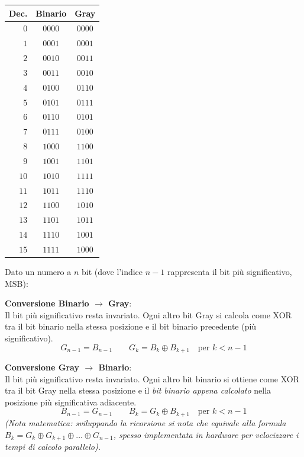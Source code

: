 \begin{minipage}[t]{0.30\linewidth}
\vspace{0pt}
\centering
\begin{tabular}{r c c}
\toprule
Dec. & Binario & Gray\\
\midrule
$0$  & $0000$ & $0000$ \\
$1$  & $0001$ & $0001$ \\
$2$  & $0010$ & $0011$ \\
$3$  & $0011$ & $0010$ \\
$4$  & $0100$ & $0110$ \\
$5$  & $0101$ & $0111$ \\
$6$  & $0110$ & $0101$ \\
$7$  & $0111$ & $0100$ \\
\midrule
$8$  & $1000$ & $1100$ \\
$9$  & $1001$ & $1101$ \\
$10$ & $1010$ & $1111$ \\
$11$ & $1011$ & $1110$ \\
$12$ & $1100$ & $1010$ \\
$13$ & $1101$ & $1011$ \\
$14$ & $1110$ & $1001$ \\
$15$ & $1111$ & $1000$ \\
\bottomrule
\end{tabular}
\end{minipage}%
\hfill
\begin{minipage}[t]{0.66\linewidth}
\vspace{0pt}
\noindent Dato un numero a $n$ bit (dove l'indice $n-1$ rappresenta il bit più significativo, MSB):

\medskip
\textbf{Conversione Binario $\to$ Gray}:\\
Il bit più significativo resta invariato. Ogni altro bit Gray si calcola come XOR tra il bit binario nella stessa posizione e il bit binario precedente (più significativo).
\[
G_{n-1} = B_{n-1} \qquad G_k = B_k \oplus B_{k+1} \quad \text{per } k < n-1
\]

\medskip
\textbf{Conversione Gray $\to$ Binario}:\\
Il bit più significativo resta invariato. Ogni altro bit binario si ottiene come XOR tra il bit Gray nella stessa posizione e il \emph{bit binario appena calcolato} nella posizione più significativa adiacente.
\[
B_{n-1} = G_{n-1} \qquad B_k = G_k \oplus B_{k+1} \quad \text{per } k < n-1
\]
\textit{(Nota matematica: sviluppando la ricorsione si nota che equivale alla formula $B_k = G_k \oplus G_{k+1} \oplus \dots \oplus G_{n-1}$, spesso implementata in hardware per velocizzare i tempi di calcolo parallelo).}
\end{minipage}

